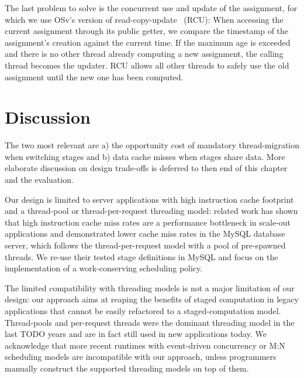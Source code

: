 \documentclass[12pt,a4paper]{book}
\begin{document}
The last problem to solve is the concurrent use and update of the assignment, for which we use OSv's version of read-copy-update~\cite{readCopyUpdate} (RCU):
When accessing the current assignment through its public getter, we compare the timestamp of the assignment's creation against the current time. 
If the maximum age is exceeded and there is no other thread already computing a new assignment, the calling thread becomes the updater.
RCU allows all other threads to safely use the old assignment until the new one has been computed.

\section{Discussion}\label{ch:di:discuss}
The two most relevant are a) the opportunity cost of mandatory thread-migration when switching stages and b) data cache misses when stages share data.
More elaborate discussion on design trade-offs is deferred to then end of this chapter and the evaluation.


Our design is limited to server applications with high instruction cache footprint and a thread-pool or thread-per-request threading model:
related work has shown that high instruction cache miss rates are a performance bottleneck in scale-out applications
and demonstrated lower cache miss rates in the MySQL database server, which follows the thread-per-request model with a pool of pre-spawned threads.
We re-use their tested stage definitions in MySQL  and focus on the implementation of a work-conserving scheduling policy.
\cite{kanev2015profiling,mysqlThreading}

The limited compatibility with threading models is not a major limitation of our design:
our approach aims at reaping the benefits of staged computation in legacy applications that cannot be easily refactored to a staged-computation model.
Thread-pools and per-request threads were the dominant threading model in the last TODO years and are in fact still used in new applications today.
We acknowledge that more recent runtimes with event-driven concurrency or M:N scheduling models are incompatible with our approach, unless programmers manually construct the supported threading models on top of them.
\end{document}
